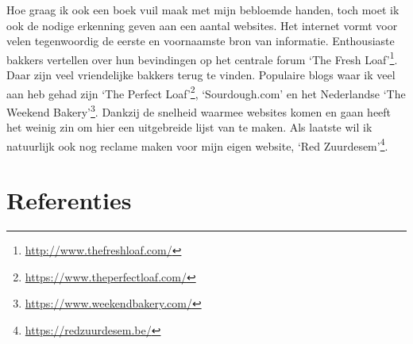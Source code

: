 \documentclass[
  11pt,
  dutch,
]{memoir}
\begin{document}
Hoe graag ik ook een boek vuil maak met mijn bebloemde handen, toch moet
ik ook de nodige erkenning geven aan een aantal websites. Het internet
vormt voor velen tegenwoordig de eerste en voornaamste bron van
informatie. Enthousiaste bakkers vertellen over hun bevindingen op het
centrale forum `The Fresh Loaf'\footnote{\url{http://www.thefreshloaf.com/}}.
Daar zijn veel vriendelijke bakkers terug te vinden. Populaire blogs
waar ik veel aan heb gehad zijn `The Perfect Loaf'\footnote{\url{https://www.theperfectloaf.com/}},
`Sourdough.com' en het Nederlandse `The Weekend Bakery'\footnote{\url{https://www.weekendbakery.com/}}.
Dankzij de snelheid waarmee websites komen en gaan heeft het weinig zin
om hier een uitgebreide lijst van te maken. Als laatste wil ik
natuurlijk ook nog reclame maken voor mijn eigen website, `Red
Zuurdesem'\footnote{\url{https://redzuurdesem.be/}}.

\hypertarget{referenties}{%
\chapter*{Referenties}\label{referenties}}
\end{document}
